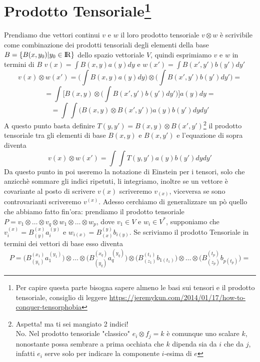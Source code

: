 \documentclass[11pt,a4paper]{article}
\theoremstyle{definition}
\theoremstyle{plain}
\theoremstyle{plain}
\begin{document}
	\section{Prodotto Tensoriale\protect\footnote{Per capire questa parte bisogna sapere almeno le basi sui tensori e il prodotto tensoriale, consiglio di leggere \href{url}{https://jeremykun.com/2014/01/17/how-to-conquer-tensorphobia}}}
		Prendiamo due vettori continui $v$ e $w$ il loro prodotto tensoriale $v\otimes w$ è scrivibile come combinazione dei prodotti tensoriali degli elementi della base $B=\{B(x,y_0)|y_0\in \rm I\!R\}$ dello spazio vettoriale $V$, quindi esprimiamo $v$ e $w$ in termini di $B$ $v(x)=\int B(x,y)a(y)dy$ e $w(x')=\int B(x',y')b(y')dy'$
		\[
			v(x)\otimes w(x')=\bigg(\int B(x,y)a(y)dy \bigg)\otimes \bigg(\int B(x',y')b(y')dy'\bigg)=
		\]
		\[
			=\int \bigg[B(x,y)\otimes\bigg(\int B(x',y')b(y')dy'\bigg)\bigg]a(y)dy=
		\]
		\[
			=\int \int \bigg(B(x,y)\otimes B(x',y')\bigg)a(y)b(y')dydy'
		\]
		A questo punto basta definire $T(y,y')=B(x,y)\otimes B(x',y')$\footnote{Aspetta! ma ti sei mangiato 2 indici!\\ No. Nel prodotto tensoriale "classico" $e_i\otimes f_j=k$ è comunque uno scalare $k$, nonostante possa sembrare a prima occhiata che $k$ dipenda sia da $i$ che da $j$, infatti $e_i$ serve solo per indicare la componente $i$-esima di $e$} il prodotto tensoriale tra gli elementi di base $B(x,y)$ e $B(x,y')$ e l'equazione di sopra diventa
		\begin{equation}
			v(x)\otimes w(x')=\int \int T(y,y')a(y)b(y')dydy'
		\end{equation}
		Da questo punto in poi useremo la notazione di Einstein per i tensori, solo che anzicchè sommare gli indici ripetuti, li integriamo, inoltre se un vettore è covariante al posto di scrivere $v(x)$ scriveremo $v_{(x)}$, viceversa se sono controvarianti scriveremo $v^{(x)}$.\newline
		Adesso cerchiamo di generalizzare un pò quello che abbiamo fatto fin'ora: prendiamo il prodotto tensoriale $P=v_1\otimes\dots\otimes v_q\otimes w_1\otimes\dots\otimes w_p$, dove $v_1\in V$ e $w_i\in V^*$, supponiamo che $v_i^{(x)}=B^{(x)}_{(y)}a_i^{(y)}$ e $w_{i(x)}=B_{(x)}^{(y)}b_{i(y)}$.\newline
		Se scriviamo il prodotto Tensoriale in termini dei vettori di base esso diventa
		\[
			P=\Big(B^{(x_1)}_{(y_1)}a_1^{(y_1)}\Big)\otimes\dots\otimes\Big(B^{(x_q)}_{(y_q)}a_q^{(y_q)}\Big)\otimes\Big(B_{(z_1)}^{(t_1)}b_{1(t_1)}\Big)\otimes\dots\otimes\Big(B_{(z_p)}^{(t_p)}b_{p(t_p)}\Big)=
		\]
\end{document}
